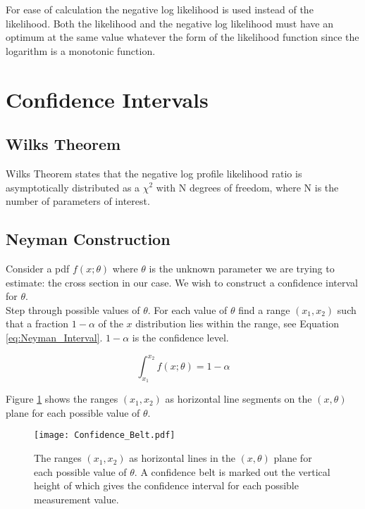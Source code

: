 For ease of calculation the negative log likelihood is used instead of the likelihood.
Both the likelihood and the negative log likelihood  must have an optimum at the same 
value whatever the form of the likelihood function since the logarithm is a monotonic 
function.

\section{Confidence Intervals}

\subsection{Wilks Theorem}

Wilks Theorem states that the negative log profile likelihood ratio is 
asymptotically distributed as a $\chi^{2}$ with N degrees of freedom, where N is
the number of parameters of interest. 

\subsection{Neyman Construction}

Consider a pdf $f\left(x;\theta\right)$ where $\theta$ is the unknown parameter 
we are trying to estimate: the cross section in our case. We wish to construct a
confidence interval for $\theta$. \\

Step through possible values of $\theta$. For each value of $\theta$ find a range 
$\left(x_{1},x_{2}\right)$ such that a fraction $1 - \alpha$ of the $x$ 
distribution lies within the range, see Equation \ref{eq:Neyman_Interval}. 
$1 - \alpha$ is the confidence level.

\begin{equation}
\int_{x_{1}}^{x_{2}} f\left(x;\theta\right) = 1 - \alpha
\label{eq:Neyman_Interval}
\end{equation} 

Figure \ref{fig:Confidence_Belt} shows the ranges $\left(x_{1},x_{2}\right)$ as
horizontal line segments on the $\left(x,\theta\right)$ plane for each possible 
value of $\theta$. \\

\begin{figure}
\begin{center}
\texttt{[image: Confidence\_Belt.pdf]}
\caption{The ranges $\left(x_{1},x_{2}\right)$ as horizontal lines in the 
$\left(x,\theta\right)$ plane for each possible value of $\theta$. A
confidence belt is marked out the vertical height of which gives the
confidence interval for each possible measurement value.}
\label{fig:Confidence_Belt}
\end{center}
\end{figure}

